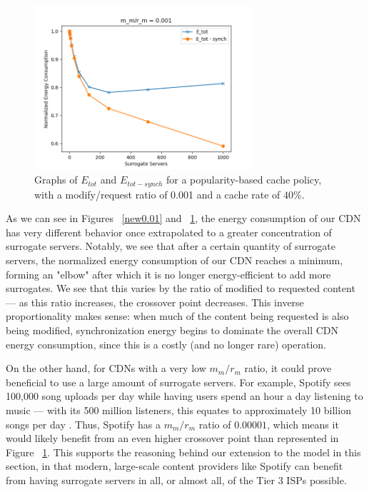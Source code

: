 \documentclass[
	a4paper, %
	10pt, %
	unnumberedsections, %
	twoside, %
]{LTJournalArticle}
\begin{document}
\begin{figure}[!hbt]
	\begin{center}
            \includegraphics[width=8.1cm]{plots/new0.001.png}
	\end{center}
	\caption{Graphs of $E_{tot}$ and $E_{tot - synch}$ for a popularity-based cache policy, with a modify/request ratio of 0.001 and a cache rate of $40\%$.}	
\label{new0.001}
\end{figure}

As we can see in Figures ~\ref{new0.01} and ~\ref{new0.001}, the energy consumption of our CDN has very different behavior once extrapolated to a greater concentration of surrogate servers. Notably, we see that after a certain quantity of surrogate servers, the normalized energy consumption of our CDN reaches a minimum, forming an "elbow" after which it is no longer energy-efficient to add more surrogates. We see that this varies by the ratio of modified to requested content --- as this ratio increases, the crossover point decreases. This inverse proportionality makes sense: when much of the content being requested is also being modified, synchronization energy begins to dominate the overall CDN energy consumption, since this is a costly (and no longer rare) operation.

On the other hand, for CDNs with a very low $m_m/r_m$ ratio, it could prove beneficial to use a large amount of surrogate servers. For example, Spotify sees 100,000 song uploads per day while having users spend an hour a day listening to music --- with its 500 million listeners, this equates to approximately 10 billion songs per day \cite{spotifyUploads, headphonesaddict_2023}. Thus, Spotify has a $m_m/r_m$ ratio of $0.00001$, which means it would likely benefit from an even higher crossover point than represented in Figure ~\ref{new0.001}. This supports the reasoning behind our extension to the model in this section, in that modern, large-scale content providers like Spotify can benefit from having surrogate servers in all, or almost all, of the Tier 3 ISPs possible.
\end{document}
